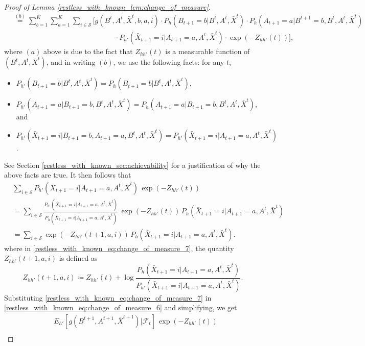 \begin{proof}[Proof of Lemma \ref{restless_with_known_lem:change_of_measure}]
\begin{align}
 	&\stackrel{(b)}{=}\sum\limits_{b=1}^{K}\sum\limits_{a=1}^{K}\sum\limits_{i\in\mathcal{S}}\bigg[g(B^t,A^t,\bar{X}^t,b, a, i)\cdot P_h(B_{t+1}=b|B^t,A^t,\bar{X}^t)\cdot P_h(A_{t+1}=a|B^{t+1}=b,B^t,A^t,\bar{X}^t)\nonumber\\
 	&\hspace{6cm} \cdot P_{h'}(\bar{X}_{t+1}=i|A_{t+1}=a,A^t,\bar{X}^t)\cdot \exp(-Z_{hh'}(t))\bigg],\label{restless_with_known_eq:change_of_measure_6}
 \end{align}\endgroup
 where $(a)$ above is due to the fact that $Z_{hh'}(t)$ is a measurable function of $(B^t, A^t,\bar{X}^t)$, and in writing $(b)$, we use the following facts: for any $t$,
 \begin{itemize}
 	\item $P_{h'}(B_{t+1}=b|B^t,A^t,\bar{X}^t)=P_h(B_{t+1}=b|B^t,A^t,\bar{X}^t)$,
 	\item $P_{h'}(A_{t+1}=a|B_{t+1}=b,B^t,A^t,\bar{X}^t)=P_h(A_{t+1}=a|B_{t+1}=b,B^t,A^t,\bar{X}^t)$, and
 	\item $P_{h'}(\bar{X}_{t+1}=i|B_{t+1}=b,A_{t+1}=a,B^t,A^t,\bar{X}^t)=P_{h'}(\bar{X}_{t+1}=i|A_{t+1}=a,A^t,\bar{X}^t)$.
 \end{itemize}
 See Section \ref{restless_with_known_sec:achievability} for a justification of why the above facts are true. It then follows that
 \begingroup \allowdisplaybreaks\begin{align}
 	& \sum\limits_{i\in\mathcal{S}}P_{h'}(\bar{X}_{t+1}=i|A_{t+1}=a,A^t,\bar{X}^t)\,\exp(-Z_{hh'}(t))\nonumber\\
 	&=\sum\limits_{i\in\mathcal{S}}\frac{P_{h'}(\bar{X}_{t+1}=i|A_{t+1}=a,A^t,\bar{X}^t)}{P_h(\bar{X}_{t+1}=i|A_{t+1}=a,A^t,\bar{X}^t)}\,\exp(-Z_{hh'}(t))\,P_h(\bar{X}_{t+1}=i|A_{t+1}=a,A^t,\bar{X}^t)\nonumber\\
 	&=\sum\limits_{i\in\mathcal{S}}\exp(-Z_{hh'}(t+1,a,i))\,P_h(\bar{X}_{t+1}=i|A_{t+1}=a,A^t,\bar{X}^t).\label{restless_with_known_eq:change_of_measure_7}
 \end{align}\endgroup
 where in \eqref{restless_with_known_eq:change_of_measure_7}, the quantity $Z_{hh'}(t+1,a,i)$ is defined as $$Z_{hh'}(t+1,a,i)\coloneqq Z_{hh'}(t)+\log\frac{P_h(\bar{X}_{t+1}=i|A_{t+1}=a,A^t,\bar{X}^t)}{P_{h'}(\bar{X}_{t+1}=i|A_{t+1}=a,A^t,\bar{X}^t)}.$$
 Substituting \eqref{restless_with_known_eq:change_of_measure_7} in \eqref{restless_with_known_eq:change_of_measure_6} and simplifying, we get
 \begingroup \allowdisplaybreaks\begin{align}
& E_{h'}[g(B^{t+1},A^{t+1},\bar{X}^{t+1})|\mathcal{F}_t]\,\exp(-Z_{hh'}(t))\nonumber\\

\end{align}
\end{proof}
